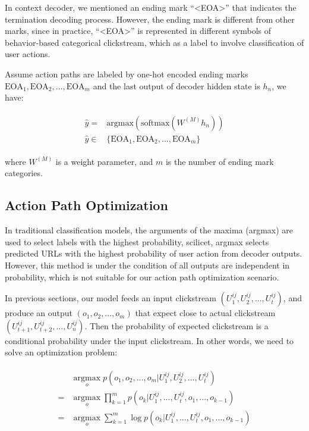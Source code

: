 In context decoder, we mentioned an ending mark ``<EOA>'' that indicates the 
termination decoding process. However, the ending mark is different from other marks, 
since in practice, ``<EOA>'' is represented in different symbols of 
behavior-based categorical clickstream, which as a label to 
involve classification of user actions.

Assume action paths are labeled by one-hot encoded ending marks 
$\text{EOA}_1, \text{EOA}_2, ..., \text{EOA}_m$ and the last output
of decoder hidden state is $h_n$, we have:

\begin{align}
\label{eqn:mark}
\begin{split}
    \hat{y} =& \text{argmax} (\text{softmax} (W^{(M)} h_n)) \\
    \hat{y} \in& \{ \text{EOA}_1, \text{EOA}_2, ..., \text{EOA}_m \}
\end{split}
\end{align}

where $W^{(M)}$ is a weight parameter, and $m$ is the number of ending mark categories.

\subsection{Action Path Optimization}
\label{sec:optimization}

In traditional classification models, the arguments of the maxima (argmax) are used 
to select labels with the highest probability, scilicet, argmax selects predicted URLs 
with the highest probability of user action from decoder outputs. However, this method 
is under the condition of all outputs are independent in probability, which 
is not suitable for our action path optimization scenario.

In previous sections, our model feeds an input clickstream $(U^{ij}_1, U^{ij}_2, ..., U^{ij}_t)$,
and produce an output $(o_1, o_2, ..., o_{m})$ that expect close to actual clickstream 
$(U^{ij}_{t+1}, U^{ij}_{t+2}, ..., U^{ij}_n)$.
Then the probability of expected clickstream is a conditional probability under 
the input clickstream. In other words, we need to solve an optimization problem:

\begin{align}
\label{eqn:optimize}
\begin{split}
    & \operatorname*{argmax}_{o} p( o_1, o_2, ..., o_{m} | U^{ij}_1, U^{ij}_2, ..., U^{ij}_t ) \\
   =& \operatorname*{argmax}_{o} \prod_{k=1}^{m} p(o_{k} | U^{ij}_1, ..., U^{ij}_t, o_1, ..., o_{k-1}) \\
   =& \operatorname*{argmax}_{o} \sum_{k=1}^{m} \log p(o_{k} | U^{ij}_1, ..., U^{ij}_t, o_1, ..., o_{k-1})
\end{split}
\end{align}

